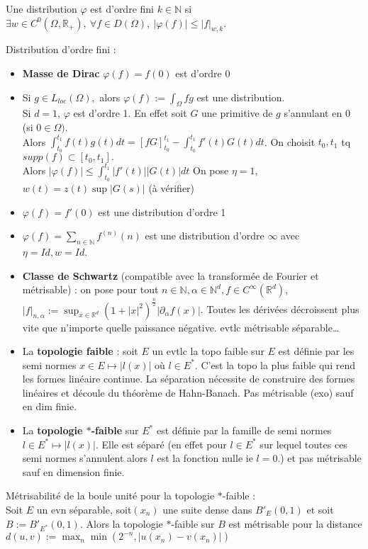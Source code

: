Une distribution $\varphi $ est d'ordre fini $k\in \mathbb{N} $ si $\exists w\in C^0(\Omega,\mathbb{R} _+),\ \forall f\in D(\Omega),\ |\varphi (f)|\le |f|_{w,k} $.
\begin{ex}
    Distribution d'ordre fini :
    \begin{itemize}
        \item \textbf{Masse de Dirac} $\varphi (f)=f(0)$ est d'ordre 0
        \item Si $g\in L_{loc}(\Omega),$ alors $\varphi (f):=\int_\Omega fg$ est une distribution. \\
            Si $d=1$, $\varphi $ est d'ordre 1. En effet soit $G$ une primitive de $g$ s'annulant en 0 (si 0$\in \Omega)$. \\Alors $\int_{t_0}^{t_1}f(t)g(t)dt=[fG]_{t_0}^{t_1}-\int_{t_0}^{t_1}f'(t)G(t)dt$. On choisit $t_0,t_1$ tq $supp(f)\subset [t_0,t_1].$ \\
            Alors $|\varphi (f)|\le\int_{t_0}^{t_1}|f'(t)| |G(t)|dt$ On pose $\eta=1 $, $w(t)=z(t)\sup|G(s)|$ (à vérifier)
        \item $\varphi (f)=f'(0)$ est une distribution d'ordre 1
        \item $\varphi (f)=\sum\limits_{n\in \mathbb{N} }^{} f^{(n)}(n)$ est une distribution d'ordre $\infty $ avec $\eta=Id, w=Id$.
        \item  \textbf{Classe de Schwartz} (compatible avec la transformée de Fourier et métrisable) : on pose pour tout $n\in \mathbb{N} , \alpha \in \mathbb{N} ^d,f\in C^\infty (\mathbb{R} ^d)$, $|f|_{n, \alpha }:=\sup_{x\in \mathbb{R} ^d}(1+|x|^2)^{\frac{n}{2}}|\partial_\alpha f(x)|$. Toutes les dérivées décroissent plus vite que n'importe quelle paissance négative. evtlc métrisable séparable\ldots
        \item La \textbf{topologie faible} : soit $E$ un evtlc la topo faible sur $E$ est définie par les semi normes $x\in E\mapsto |l(x)|$ où $l\in E^*$. C'est la topo la plus faible qui rend les formes linéaire continue. La séparation nécessite de construire des formes linéaires et découle du théorème de Hahn-Banach. Pas métrisable (exo) sauf en dim finie.
        \item La \textbf{topologie $*$-faible} sur $E^*$ est définie par la famille de semi normes $l\in E^*\mapsto |l(x)|$. Elle est séparé (en effet pour $l\in E^*$ sur lequel toutes ces semi normes s'annulent alors $l$ est la fonction nulle ie $l=0$.) et pas métrisable sauf en dimension finie.
    \end{itemize}
\end{ex}
\begin{proposition}
    Métrisabilité de la boule unité pour la topologie $*$-faible :\\
    Soit $E$ un evn séparable, soit$(x_{n})$ une suite dense dans $B'_E(0,1)$ et soit $B:=B'_{E^*}(0,1)$. Alors la topologie $*$-faible sur $B$ est métrisable pour la distance $d(u,v):=\max_n\min(2^{-n}, |u(x_{n})-v(x_{n})|)$
\end{proposition}

